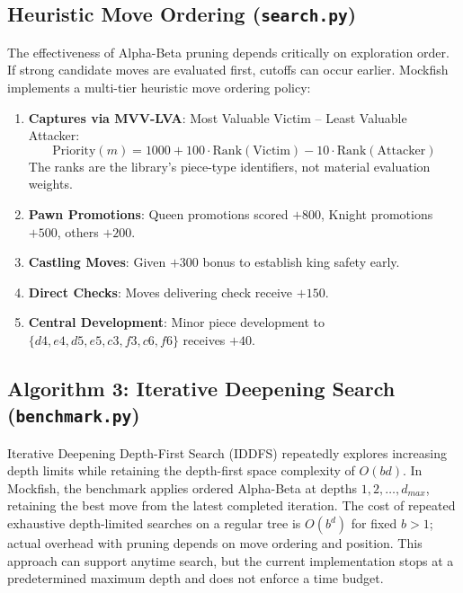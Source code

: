 \documentclass[11pt,a4paper]{article}
\begin{document}
\subsection{Heuristic Move Ordering (\texttt{search.py})}
The effectiveness of Alpha-Beta pruning depends critically on exploration order. If strong candidate moves are evaluated first, cutoffs can occur earlier. Mockfish implements a multi-tier heuristic move ordering policy:
\begin{enumerate}[leftmargin=*]
    \item \textbf{Captures via MVV-LVA}: Most Valuable Victim -- Least Valuable Attacker:
    \[\text{Priority}(m)=1000+100\cdot\text{Rank}(\text{Victim})-10\cdot\text{Rank}(\text{Attacker})\]
    The ranks are the library's piece-type identifiers, not material evaluation weights.
    \item \textbf{Pawn Promotions}: Queen promotions scored $+800$, Knight promotions $+500$, others $+200$.
    \item \textbf{Castling Moves}: Given $+300$ bonus to establish king safety early.
    \item \textbf{Direct Checks}: Moves delivering check receive $+150$.
    \item \textbf{Central Development}: Minor piece development to $\{d4,e4,d5,e5,c3,f3,c6,f6\}$ receives $+40$.
\end{enumerate}
\subsection{Algorithm 3: Iterative Deepening Search (\texttt{benchmark.py})}
Iterative Deepening Depth-First Search (IDDFS) repeatedly explores increasing depth limits while retaining the depth-first space complexity of $O(bd)$. In Mockfish, the benchmark applies ordered Alpha-Beta at depths $1,2,\dots,d_{max}$, retaining the best move from the latest completed iteration. The cost of repeated exhaustive depth-limited searches on a regular tree is $O(b^d)$ for fixed $b>1$; actual overhead with pruning depends on move ordering and position. This approach can support anytime search, but the current implementation stops at a predetermined maximum depth and does not enforce a time budget.
\end{document}
